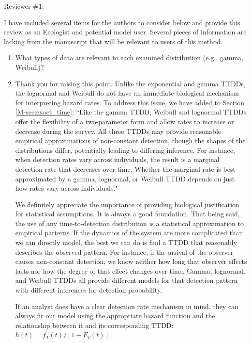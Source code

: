 \documentclass[12pt]{article}
\renewenvironment{quote}  %
              {\list{}{\rightmargin\leftmargin}\normalfont%
               \item\relax}
              {\endlist}
\begin{document}
\newpage



Reviewer \#1:

I have included several items for the authors to consider below and provide this review as an Ecologist and potential model user.
Several pieces of information are lacking from the manuscript that will be relevant to users of this method.
\begin{enumerate}
\item What types of data are relevant to each examined distribution (e.g., gamma, Weibull)?

\begin{quote}\label{ans:one}
Thank you for raising this point.
Unlike the exponential and gamma TTDDs, the lognormal and Weibull do not have an immediate biological mechanism for interpreting hazard rates.
To address this issue, we have added to Section \ref{M-sec:exact_time}: ``Like the gamma TTDD, Weibull and lognormal TTDDs offer the flexibility of a two-parameter form and allow rates to increase or decrease during the survey.
All three TTDDs may provide reasonable empirical approximations of non-constant detection, though the shapes of the distributions differ, potentially leading to differing inference.
For instance, when detection rates vary across individuals, the result is a marginal detection rate that decreases over time.
Whether the marginal rate is best approximated by a gamma, lognormal, or Weibull TTDD depends on just how rates vary across individuals."

We definitely appreciate the importance of providing biological justification for statistical assumptions.
It is always a good foundation.
That being said, the use of any time-to-detection distribution is a statistical approximation to empirical patterns.
If the dynamics of the system are more complicated than we can directly model, the best we can do is find a TTDD that reasonably describes the observed pattern.
For instance, if the arrival of the observer causes non-constant detection, we know neither how long that observer effects lasts nor how the degree of that effect changes over time.
Gamma, lognormal, and Weibull TTDDs all provide different models for that detection pattern with different inferences for detection probability.

If an analyst does have a clear detection rate mechanism in mind, they can always fit our model using the appropriate hazard function and the relationship between it and its corresponding TTDD: $h(t) = f_T(t) / [1-F_T(t)]$.
\end{quote}


\end{enumerate}
\end{document}
